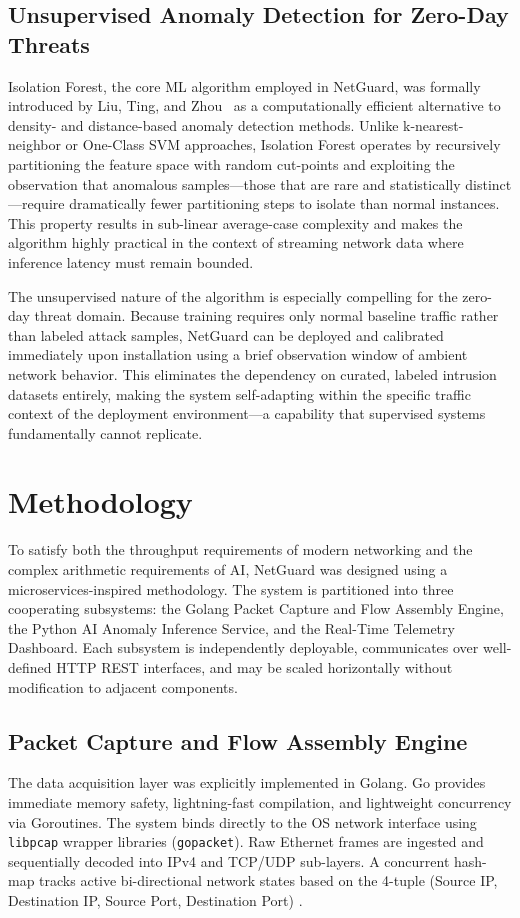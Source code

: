 \documentclass[conference]{IEEEtran}
\begin{document}
\subsection{Unsupervised Anomaly Detection for Zero-Day Threats}
Isolation Forest, the core ML algorithm employed in NetGuard, was formally introduced by Liu, Ting, and Zhou~\cite{liu2008} as a computationally efficient alternative to density- and distance-based anomaly detection methods. Unlike k-nearest-neighbor or One-Class SVM approaches, Isolation Forest operates by recursively partitioning the feature space with random cut-points and exploiting the observation that anomalous samples---those that are rare and statistically distinct---require dramatically fewer partitioning steps to isolate than normal instances. This property results in sub-linear average-case complexity and makes the algorithm highly practical in the context of streaming network data where inference latency must remain bounded.

The unsupervised nature of the algorithm is especially compelling for the zero-day threat domain. Because training requires only normal baseline traffic rather than labeled attack samples, NetGuard can be deployed and calibrated immediately upon installation using a brief observation window of ambient network behavior. This eliminates the dependency on curated, labeled intrusion datasets entirely, making the system self-adapting within the specific traffic context of the deployment environment---a capability that supervised systems fundamentally cannot replicate.

\section{Methodology}
To satisfy both the throughput requirements of modern networking and the complex arithmetic requirements of AI, NetGuard was designed using a microservices-inspired methodology. The system is partitioned into three cooperating subsystems: the Golang Packet Capture and Flow Assembly Engine, the Python AI Anomaly Inference Service, and the Real-Time Telemetry Dashboard. Each subsystem is independently deployable, communicates over well-defined HTTP REST interfaces, and may be scaled horizontally without modification to adjacent components.

\subsection{Packet Capture and Flow Assembly Engine}
The data acquisition layer was explicitly implemented in Golang. Go provides immediate memory safety, lightning-fast compilation, and lightweight concurrency via Goroutines. The system binds directly to the OS network interface using \texttt{libpcap} wrapper libraries (\texttt{gopacket}). Raw Ethernet frames are ingested and sequentially decoded into IPv4 and TCP/UDP sub-layers. A concurrent hash-map tracks active bi-directional network states based on the 4-tuple (Source IP, Destination IP, Source Port, Destination Port) \cite{gopacket2025}.
\end{document}
